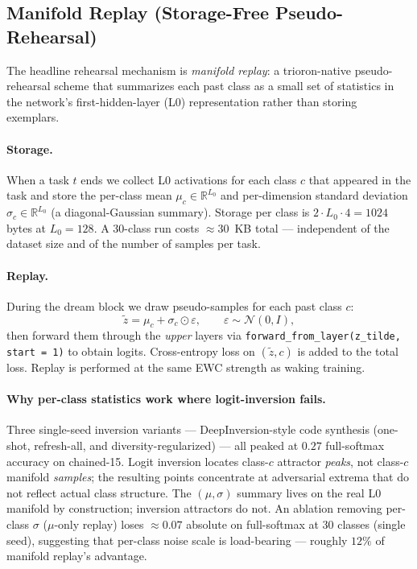 \documentclass[11pt]{article}
\newcommand{\R}{\mathbb{R}}
\begin{document}
\subsection{Manifold Replay (Storage-Free Pseudo-Rehearsal)}
\label{sec:manifold-replay}\label{app:manifold}

The headline rehearsal mechanism is \emph{manifold replay}: a
trioron-native pseudo-rehearsal scheme that summarizes each past class
as a small set of statistics in the network's first-hidden-layer (L0)
representation rather than storing exemplars.

\paragraph{Storage.}
When a task $t$ ends we collect L0 activations for each class $c$ that
appeared in the task and store the per-class mean
$\mu_c \in \R^{L_0}$ and per-dimension standard deviation
$\sigma_c \in \R^{L_0}$ (a diagonal-Gaussian summary). Storage per
class is $2 \cdot L_0 \cdot 4 = 1024$ bytes at $L_0 = 128$. A 30-class
run costs $\approx\!30$~KB total --- independent of the dataset size
and of the number of samples per task.

\paragraph{Replay.}
During the dream block we draw pseudo-samples for each past class $c$:
\begin{equation}
  \tilde z = \mu_c + \sigma_c \odot \varepsilon,
  \qquad \varepsilon \sim \mathcal{N}(0, I),
\end{equation}
then forward them through the \emph{upper} layers via
\texttt{forward\_from\_layer(z\_tilde, start = 1)} to obtain logits.
Cross-entropy loss on $(\tilde z, c)$ is added to the total loss.
Replay is performed at the same EWC strength as waking training.

\paragraph{Why per-class statistics work where logit-inversion fails.}
Three single-seed inversion variants ---
DeepInversion-style code synthesis \citep{yin2020deepinversion}
(one-shot, refresh-all, and diversity-regularized) --- all peaked at
$0.27$ full-softmax accuracy on chained-15. Logit inversion locates
class-$c$ attractor \emph{peaks}, not class-$c$ manifold
\emph{samples}; the resulting points concentrate at adversarial extrema
that do not reflect actual class structure. The $(\mu, \sigma)$ summary
lives on the real L0 manifold by construction; inversion attractors do
not. An ablation removing per-class $\sigma$ ($\mu$-only replay) loses
$\approx\!0.07$ absolute on full-softmax at 30 classes (single seed),
suggesting that per-class noise scale is load-bearing --- roughly
$12\%$ of manifold replay's advantage.
\end{document}
